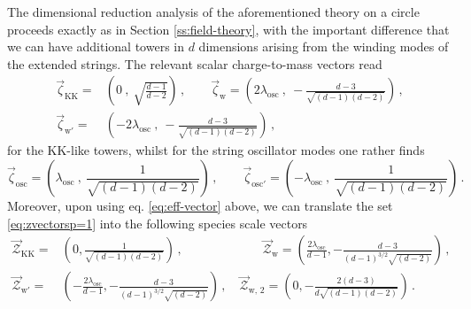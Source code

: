 The dimensional reduction analysis of the aforementioned theory on a circle proceeds exactly as in Section \ref{ss:field-theory}, with the important difference that we can have additional towers in $d$ dimensions arising from the winding modes of the extended strings. The relevant scalar charge-to-mass vectors read \cite{Etheredge:2022opl}
%
\begin{equation}\label{eq:zvectorsp=1}
\begin{split} 
	\vec{\zeta}_{\text{KK}} =& \left( 0 \ ,\ \sqrt{\frac{d-1}{d-2}} \right)\, , \qquad \vec{\zeta}_{\text{w}} = \left( 2 \lambda_{\text{osc}} \ ,\ - \frac{d-3}{\sqrt{(d-1)(d-2)}} \right) \, ,\\
	\vec{\zeta}_{\text{w}'} =& \left( -2 \lambda_{\text{osc}} \ ,\ - \frac{d-3}{\sqrt{(d-1)(d-2)}} \right) \, ,
\end{split}
\end{equation}
%
for the KK-like towers, whilst for the string oscillator modes one rather finds
%
\begin{equation}\label{eq:zvectorsStrings}
  \vec{\zeta}_{\text{osc}} =\left( \lambda_{\text{osc}} \ ,\ \frac{1}{\sqrt{(d-1)(d-2)}} \right) \, , \qquad 
  \vec{\zeta}_{\text{osc}'} = \left( - \lambda_{\text{osc}} \ ,\ \frac{1}{\sqrt{(d-1)(d-2)}} \right) \, .
\end{equation}
%
Moreover, upon using eq. \eqref{eq:eff-vector} above, we can translate the set \eqref{eq:zvectorsp=1} into the following species scale vectors
%
\begin{equation}\label{vectors2}
\begin{split} 
	\vec{\mathcal{Z}}_{\text{KK}} =& \left( 0 , \frac{1}{\sqrt{(d-1)(d-2)}} \right)\, , \qquad \qquad \qquad \ \ \vec{\mathcal{Z}}_{\text{w}} = \left( \frac{2 \lambda_{\text{osc}}}{d-1} , - \frac{d-3}{(d-1)^{3/2}\sqrt{(d-2)}} \right) \, ,\\
	\vec{\mathcal{Z}}_{\text{w}'} =& \left( -\frac{2 \lambda_{\text{osc}}}{d-1} , - \frac{d-3}{(d-1)^{3/2}\sqrt{(d-2)}} \right) \, , \quad \vec{\mathcal{Z}}_{\text{w}, \,2} = \left( 0 , - \frac{2(d-3)}{d\sqrt{(d-1)(d-2)}} \right) \, .
\end{split}
\end{equation}
%
